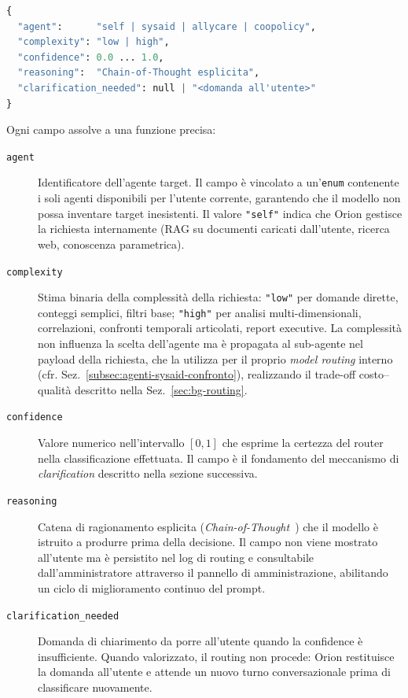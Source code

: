 \begin{lstlisting}[language=Python,caption={Schema dell'output strutturato del router.},label={lst:router-schema}]
{
  "agent":      "self | sysaid | allycare | coopolicy",
  "complexity": "low | high",
  "confidence": 0.0 ... 1.0,
  "reasoning":  "Chain-of-Thought esplicita",
  "clarification_needed": null | "<domanda all'utente>"
}
\end{lstlisting}

Ogni campo assolve a una funzione precisa:

\begin{description}
  \item[\texttt{agent}] Identificatore dell'agente target. 
  Il campo è vincolato a un'\texttt{enum} contenente i soli agenti disponibili per l'utente corrente, 
  garantendo che il modello non possa inventare target inesistenti. 
  Il valore \texttt{"self"} indica che Orion gestisce la richiesta internamente 
  (RAG su documenti caricati dall'utente, ricerca web, conoscenza parametrica).

  \item[\texttt{complexity}] Stima binaria della complessità della richiesta: \texttt{"low"} per domande dirette, 
  conteggi semplici, filtri base; \texttt{"high"} per analisi multi-dimensionali, correlazioni, 
  confronti temporali articolati, report executive. 
  La complessità non influenza la scelta dell'agente ma è propagata al sub-agente nel 
  payload della richiesta, che la utilizza per il proprio \emph{model routing} interno (cfr. Sez.~\ref{subsec:agenti-sysaid-confronto}), 
  realizzando il trade-off costo--qualità descritto nella Sez.~\ref{sec:bg-routing}.

  \item[\texttt{confidence}] Valore numerico nell'intervallo $[0, 1]$ 
  che esprime la certezza del router nella classificazione effettuata. 
  Il campo è il fondamento del meccanismo di \emph{clarification} descritto nella sezione successiva.

  \item[\texttt{reasoning}] Catena di ragionamento esplicita (\emph{Chain-of-Thought}~\cite{wei2022cot}) 
  che il modello è istruito a produrre prima della decisione. 
  Il campo non viene mostrato all'utente ma è persistito nel log di routing e 
  consultabile dall'amministratore attraverso il pannello di amministrazione, 
  abilitando un ciclo di miglioramento continuo del prompt.

  \item[\texttt{clarification\_needed}] Domanda di chiarimento da porre all'utente quando la confidence è insufficiente. 
  Quando valorizzato, il routing non procede: Orion restituisce la domanda all'utente e 
  attende un nuovo turno conversazionale prima di classificare nuovamente.

\end{description}


